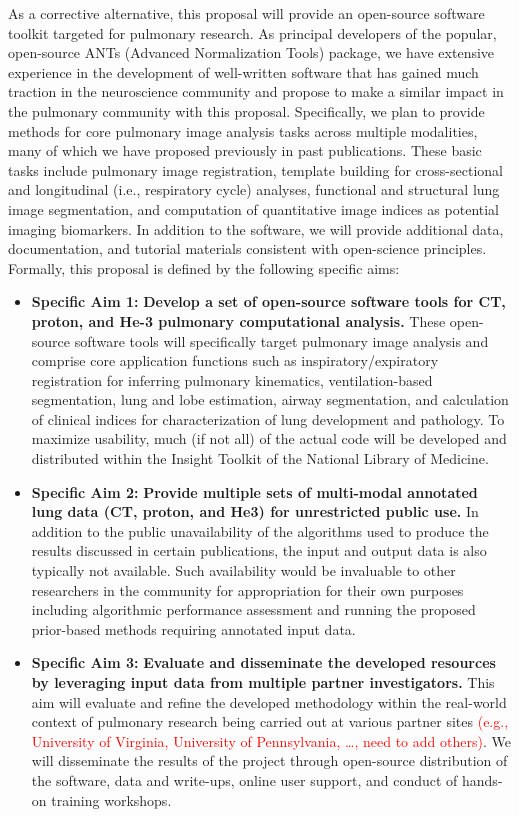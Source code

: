 \documentclass[11pt,]{article}
\begin{document}
As a corrective alternative, this proposal will provide an open-source
software toolkit targeted for pulmonary research. As principal
developers of the popular, open-source ANTs (Advanced Normalization
Tools) package, we have extensive experience in the development of
well-written software that has gained much traction in the neuroscience
community and propose to make a similar impact in the pulmonary
community with this proposal. Specifically, we plan to provide methods
for core pulmonary image analysis tasks across multiple modalities, many
of which we have proposed previously in past publications. These basic
tasks include pulmonary image registration, template building for
cross-sectional and longitudinal (i.e., respiratory cycle) analyses,
functional and structural lung image segmentation, and computation of
quantitative image indices as potential imaging biomarkers. In addition
to the software, we will provide additional data, documentation, and
tutorial materials consistent with open-science principles. Formally,
this proposal is defined by the following specific aims:

\begin{itemize}
\itemsep1pt\parskip0pt
\item
  \textbf{Specific Aim 1:} \textbf{Develop a set of open-source software
  tools for CT, proton, and He-3 pulmonary computational analysis.}
  These open-source software tools will specifically target pulmonary
  image analysis and comprise core application functions such as
  inspiratory/expiratory registration for inferring pulmonary
  kinematics, ventilation-based segmentation, lung and lobe estimation,
  airway segmentation, and calculation of clinical indices for
  characterization of lung development and pathology. To maximize
  usability, much (if not all) of the actual code will be developed and
  distributed within the Insight Toolkit of the National Library of
  Medicine.
\item
  \textbf{Specific Aim 2:} \textbf{Provide multiple sets of multi-modal
  annotated lung data (CT, proton, and He3) for unrestricted public
  use.} In addition to the public unavailability of the algorithms used
  to produce the results discussed in certain publications, the input
  and output data is also typically not available. Such availability
  would be invaluable to other researchers in the community for
  appropriation for their own purposes including algorithmic performance
  assessment and running the proposed prior-based methods requiring
  annotated input data.
\item
  \textbf{Specific Aim 3:} \textbf{Evaluate and disseminate the
  developed resources by leveraging input data from multiple partner
  investigators.} This aim will evaluate and refine the developed
  methodology within the real-world context of pulmonary research being
  carried out at various partner sites
  \textcolor{red}{(e.g., University of Virginia, University of Pennsylvania, \ldots,
  need to add others)}. We will disseminate the results of the project
  through open-source distribution of the software, data and write-ups,
  online user support, and conduct of hands-on training workshops.
\end{itemize}
\end{document}
